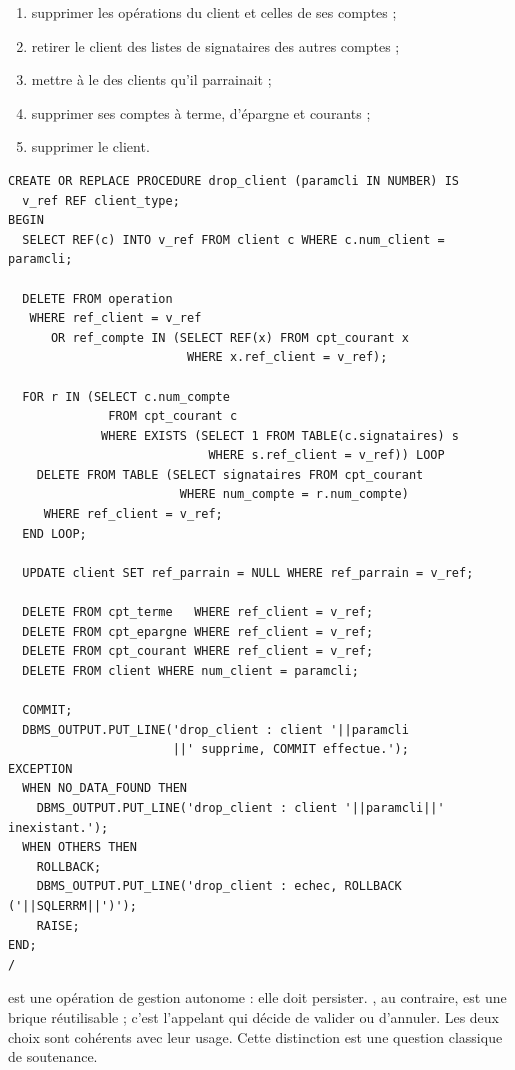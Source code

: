 \begin{enumerate}
  \item supprimer les opérations du client et celles de ses comptes ;
  \item retirer le client des listes de signataires des autres comptes ;
  \item mettre à  le  des clients qu'il
        parrainait ;
  \item supprimer ses comptes à terme, d'épargne et courants ;
  \item supprimer le client.
\end{enumerate}

\begin{lstlisting}[caption={Procédure \code{drop\_client}.},label={lst:drop-client}]
CREATE OR REPLACE PROCEDURE drop_client (paramcli IN NUMBER) IS
  v_ref REF client_type;
BEGIN
  SELECT REF(c) INTO v_ref FROM client c WHERE c.num_client = paramcli;

  DELETE FROM operation
   WHERE ref_client = v_ref
      OR ref_compte IN (SELECT REF(x) FROM cpt_courant x
                         WHERE x.ref_client = v_ref);

  FOR r IN (SELECT c.num_compte
              FROM cpt_courant c
             WHERE EXISTS (SELECT 1 FROM TABLE(c.signataires) s
                            WHERE s.ref_client = v_ref)) LOOP
    DELETE FROM TABLE (SELECT signataires FROM cpt_courant
                        WHERE num_compte = r.num_compte)
     WHERE ref_client = v_ref;
  END LOOP;

  UPDATE client SET ref_parrain = NULL WHERE ref_parrain = v_ref;

  DELETE FROM cpt_terme   WHERE ref_client = v_ref;
  DELETE FROM cpt_epargne WHERE ref_client = v_ref;
  DELETE FROM cpt_courant WHERE ref_client = v_ref;
  DELETE FROM client WHERE num_client = paramcli;

  COMMIT;
  DBMS_OUTPUT.PUT_LINE('drop_client : client '||paramcli
                       ||' supprime, COMMIT effectue.');
EXCEPTION
  WHEN NO_DATA_FOUND THEN
    DBMS_OUTPUT.PUT_LINE('drop_client : client '||paramcli||' inexistant.');
  WHEN OTHERS THEN
    ROLLBACK;
    DBMS_OUTPUT.PUT_LINE('drop_client : echec, ROLLBACK ('||SQLERRM||')');
    RAISE;
END;
/
\end{lstlisting}

\begin{attentionbox}
 est une opération de gestion autonome : elle doit persister.
, au contraire, est une brique réutilisable ; c'est l'appelant
qui décide de valider ou d'annuler. Les deux choix sont cohérents avec leur
usage. Cette distinction est une question classique de soutenance.
\end{attentionbox}

